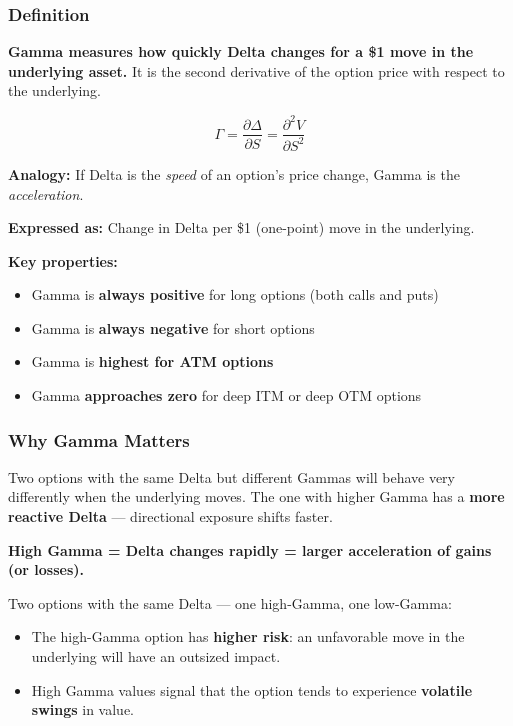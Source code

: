 \documentclass[12pt,openany]{book}
\begin{document}
\subsubsection{Definition}

\textbf{Gamma measures how quickly Delta changes for a \$1 move in the underlying asset.} It is the second derivative of the option price with respect to the underlying.

\[
\Gamma = \frac{\partial \Delta}{\partial S} = \frac{\partial^2 V}{\partial S^2}
\]

\textbf{Analogy:} If Delta is the \emph{speed} of an option's price change, Gamma is the \emph{acceleration}.

\textbf{Expressed as:} Change in Delta per \$1 (one-point) move in the underlying.

\textbf{Key properties:}
\begin{itemize}[leftmargin=*]
    \item Gamma is \textbf{always positive} for long options (both calls and puts)
    \item Gamma is \textbf{always negative} for short options
    \item Gamma is \textbf{highest for ATM options}
    \item Gamma \textbf{approaches zero} for deep ITM or deep OTM options
\end{itemize}

\subsubsection{Why Gamma Matters}

Two options with the same Delta but different Gammas will behave very differently when the underlying moves. The one with higher Gamma has a \textbf{more reactive Delta} — directional exposure shifts faster.

\textbf{High Gamma = Delta changes rapidly = larger acceleration of gains (or losses).}

Two options with the same Delta — one high-Gamma, one low-Gamma:
\begin{itemize}[leftmargin=*]
    \item The high-Gamma option has \textbf{higher risk}: an unfavorable move in the underlying will have an outsized impact.
    \item High Gamma values signal that the option tends to experience \textbf{volatile swings} in value.
\end{itemize}
\end{document}
